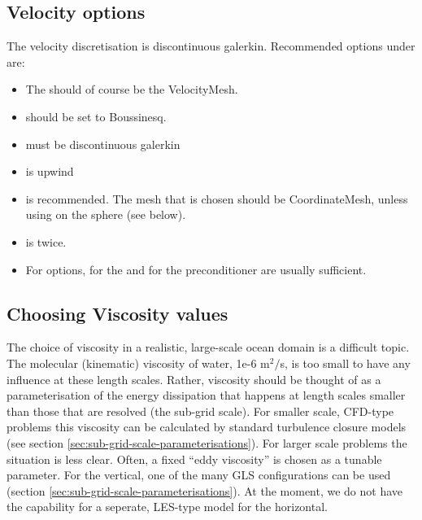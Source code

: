 \subsection{Velocity options}
The velocity discretisation is discontinuous galerkin. Recommended options under
 are:

\begin{itemize}
  \item The  should of course be the VelocityMesh.
  \item {} should be set to Boussinesq.
  \item {} must be discontinuous galerkin
  \item {} is upwind
  \item
     is
    recommended. The mesh that is chosen should be CoordinateMesh, unless
    using  on the sphere (see below).
  \item
    is twice.
  \item For  options,  for the
     and  for the preconditioner are
    usually sufficient.
\end{itemize}

\subsection{Choosing Viscosity values}
The choice of viscosity in a realistic, large-scale ocean domain is a difficult
topic. The molecular (kinematic) viscosity of water, 1e-6 m$^2/$s, is too small
to have any influence at these length scales. Rather, viscosity should be thought
of as a parameterisation of the energy dissipation that happens at length scales
smaller than those that are resolved (the sub-grid scale). For smaller 
scale, CFD-type problems this viscosity can be calculated by standard turbulence
closure models (see section \ref{sec:sub-grid-scale-parameterisations}). For
larger scale problems the situation is less clear. Often, a fixed ``eddy
viscosity'' is chosen as a tunable parameter. For the vertical, one of the many
GLS configurations can be used (section
\ref{sec:sub-grid-scale-parameterisations}). At the moment, we do not have the
capability for a seperate, LES-type model for the horizontal. 


